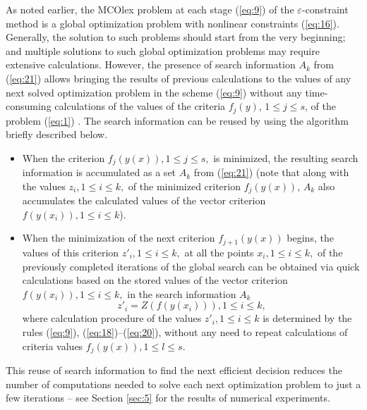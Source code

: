 \documentclass[smallextended]{svjour3}       %
\begin{document}
As noted earlier, the MCOlex problem at each stage (\ref{eq:9}) of the $\varepsilon$-constraint method is a global optimization problem with nonlinear constraints (\ref{eq:16}). Generally, the solution to such problems should start from the very beginning; and multiple solutions to such global optimization problems may require extensive calculations. However, the presence of search information $A_k$ from (\ref{eq:21}) allows bringing the results of previous calculations to the values of any next solved optimization problem in the scheme (\ref{eq:9}) without any time-consuming calculations of the values of the criteria $f_j (y)$, $1 \leq j \leq s$, of the problem (\ref{eq:1}) \cite{c30,c31}. 
The search information can be reused by using the algorithm briefly described below.
\begin{itemize}
\item 
When the criterion $f_j(y(x)), 1\leq j\leq s,$ is minimized, the resulting search information is accumulated as a set $A_k$ from (\ref{eq:21}) (note that along with the values $z_i, 1\leq i\leq k,$ of the minimized criterion $f_j(y(x))$, $A_k$ also accumulates the calculated values of the vector criterion $f(y(x_i)), 1\leq i\leq k$).
\item 
When the minimization of the next criterion $f_{j+1}(y(x))$ begins, the values of this criterion $z'_i, 1\leq i\leq k,$ at all the points  $x_i, 1\leq i\leq k,$ of the previously completed iterations of the global search can be obtained via quick calculations based on the stored values of the vector criterion $f(y(x_i)), 1\leq i\leq k,$ in the search information $A_k$
\begin{equation}\label{new_equation}
z'_i=Z(f(y(x_i))), 1\leq i\leq k,
\end{equation}
where calculation procedure of the values $z'_i, 1\leq i\leq k$ is determined by the rules (\ref{eq:9}), (\ref{eq:18})--(\ref{eq:20}), without any need to repeat calculations of criteria values $f_j(y(x)), 1\leq l\leq s$.
\end{itemize}

This reuse of search information to find the next efficient decision reduces the number of computations needed to solve each next optimization problem to just a few iterations -- see Section \ref{sec:5} for the results of numerical experiments.
\end{document}
